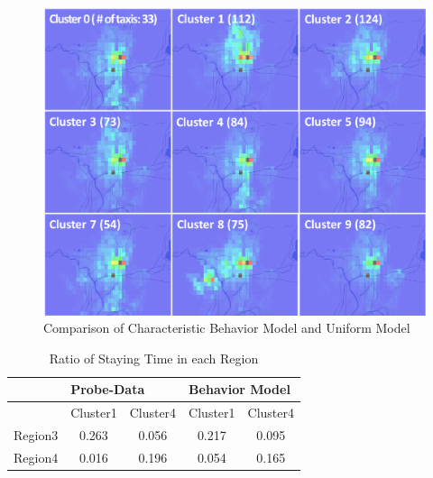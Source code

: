 \begin{figure}
  \centering
  \includegraphics[width=.7\linewidth]{Figs.hatto/fig-hatto-02.eps}
  \caption{Comparison of Characteristic Behavior Model and Uniform Model}
  \label{fig:Figs.hatto/fig-hatto-02.eps}
\end{figure}

\begin{table}[]
\centering
\caption{Ratio of Staying Time in each Region}
\label{tbl:ratio-of-staying}
\begin{tabular}{|c|c|c|c|c|}
        \hline
        & \multicolumn{2}{|l|}{Probe-Data} & \multicolumn{2}{|l|}{Behavior Model} \\
        \hline
        & Cluster1       & Cluster4      & Cluster1         & Cluster4        \\
        \hline
Region3 & 0.263          & 0.056         & 0.217            & 0.095           \\
        \hline
Region4 & 0.016          & 0.196         & 0.054            & 0.165          \\
        \hline
\end{tabular}
\end{table}

